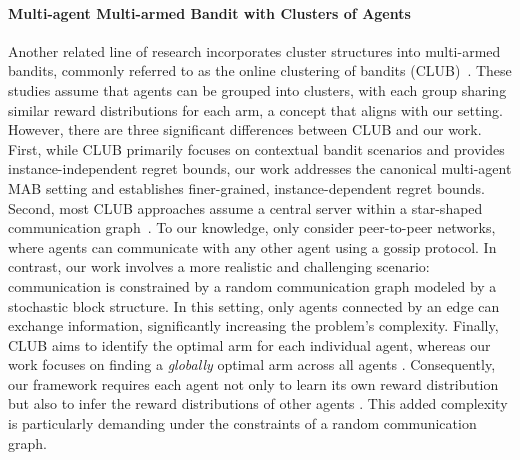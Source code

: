 \paragraph{Multi-agent Multi-armed Bandit with Clusters of Agents} 
Another related line of research incorporates cluster structures into multi-armed bandits, commonly referred to as the online clustering of bandits (CLUB)~\cite{gentile2014online,nguyen2014dynamic,li2016online,li2016collaborative,korda2016distributed,li2018online,li2019improved,gentile2017context,li2023clustering,ban2024meta,8440090,liu2022federated,wu2021clustering,blaser2024federated,yang2024federated,li2025demystifying, pal2024blocked}. These studies assume that agents can be grouped into clusters, with each group sharing similar reward distributions for each arm, a concept that aligns with our setting. However, there are three significant differences between CLUB and our work.
First, while CLUB primarily focuses on contextual bandit scenarios and provides instance-independent regret bounds, our work addresses the canonical multi-agent MAB setting and establishes finer-grained, instance-dependent regret bounds.
Second, most CLUB approaches assume a central server within a star-shaped communication graph~\cite{liu2022federated,blaser2024federated,yang2024federated}. To our knowledge, only \citet{korda2016distributed} consider peer-to-peer networks, where agents can communicate with any other agent using a gossip protocol. In contrast, our work involves a more realistic and challenging scenario: communication is constrained by a random communication graph modeled by a stochastic block structure. In this setting, only agents connected by an edge can exchange information, significantly increasing the problem's complexity.
Finally, CLUB aims to identify the optimal arm for each individual agent, whereas our work focuses on finding a \textit{globally} optimal arm across all agents . Consequently, our framework requires each agent not only to learn its own reward distribution but also to infer the reward distributions of other agents . This added complexity is particularly demanding under the constraints of a random communication graph.



